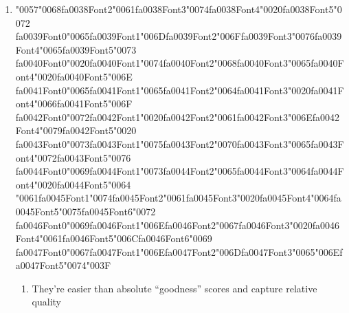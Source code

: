 \documentclass[12pt]{article}
\begin{document}
\begin{enumerate}[label=Q\arabic*.]
\item {\char"0057}{\char"0068}{\csname fa0038Font2\endcsname\char"0061}{\csname fa0038Font3\endcsname\char"0074}{\csname fa0038Font4\endcsname\char"0020}{\csname fa0038Font5\endcsname\char"0072} {\csname fa0039Font0\endcsname\char"0065}{\csname fa0039Font1\endcsname\char"006D}{\csname fa0039Font2\endcsname\char"006F}{\csname fa0039Font3\endcsname\char"0076}{\csname fa0039Font4\endcsname\char"0065}{\csname fa0039Font5\endcsname\char"0073} {\csname fa0040Font0\endcsname\char"0020}{\csname fa0040Font1\endcsname\char"0074}{\csname fa0040Font2\endcsname\char"0068}{\csname fa0040Font3\endcsname\char"0065}{\csname fa0040Font4\endcsname\char"0020}{\csname fa0040Font5\endcsname\char"006E} {\csname fa0041Font0\endcsname\char"0065}{\csname fa0041Font1\endcsname\char"0065}{\csname fa0041Font2\endcsname\char"0064}{\csname fa0041Font3\endcsname\char"0020}{\csname fa0041Font4\endcsname\char"0066}{\csname fa0041Font5\endcsname\char"006F} {\csname fa0042Font0\endcsname\char"0072}{\csname fa0042Font1\endcsname\char"0020}{\csname fa0042Font2\endcsname\char"0061}{\csname fa0042Font3\endcsname\char"006E}{\csname fa0042Font4\endcsname\char"0079}{\csname fa0042Font5\endcsname\char"0020} {\csname fa0043Font0\endcsname\char"0073}{\csname fa0043Font1\endcsname\char"0075}{\csname fa0043Font2\endcsname\char"0070}{\csname fa0043Font3\endcsname\char"0065}{\csname fa0043Font4\endcsname\char"0072}{\csname fa0043Font5\endcsname\char"0076} {\csname fa0044Font0\endcsname\char"0069}{\csname fa0044Font1\endcsname\char"0073}{\csname fa0044Font2\endcsname\char"0065}{\csname fa0044Font3\endcsname\char"0064}{\csname fa0044Font4\endcsname\char"0020}{\csname fa0044Font5\endcsname\char"0064} {\char"0061}{\csname fa0045Font1\endcsname\char"0074}{\csname fa0045Font2\endcsname\char"0061}{\csname fa0045Font3\endcsname\char"0020}{\csname fa0045Font4\endcsname\char"0064}{\csname fa0045Font5\endcsname\char"0075}{\csname fa0045Font6\endcsname\char"0072} {\csname fa0046Font0\endcsname\char"0069}{\csname fa0046Font1\endcsname\char"006E}{\csname fa0046Font2\endcsname\char"0067}{\csname fa0046Font3\endcsname\char"0020}{\csname fa0046Font4\endcsname\char"0061}{\csname fa0046Font5\endcsname\char"006C}{\csname fa0046Font6\endcsname\char"0069} {\csname fa0047Font0\endcsname\char"0067}{\csname fa0047Font1\endcsname\char"006E}{\csname fa0047Font2\endcsname\char"006D}{\csname fa0047Font3\endcsname\char"0065}{\char"006E}{\csname fa0047Font5\endcsname\char"0074}{\char"003F}
\begin{enumerate}[label=(\Alph*)]
    \item They're easier than absolute ``goodness'' scores and capture relative quality

\end{enumerate}
\end{enumerate}
\end{document}
